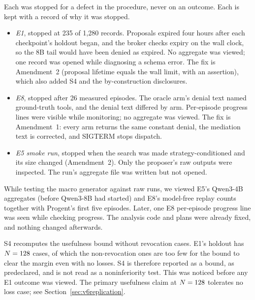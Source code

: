  Each was stopped for a defect in the procedure, never on an outcome. Each is kept with a record of why it was stopped.
\begin{itemize}
  \item \emph{E1}, stopped at 235 of 1{,}280 records. Proposals expired four hours after each checkpoint's holdout
        began, and the broker checks expiry on the wall clock, so the 8B tail would have been denied as expired. No
        aggregate was viewed; one record was opened while diagnosing a schema error. The fix is Amendment~2 (proposal
        lifetime equals the wall limit, with an assertion), which also added S4 and the by-construction disclosures.
  \item \emph{E8}, stopped after 26 measured episodes. The oracle arm's denial text named ground-truth tools, and the
        denial text differed by arm. Per-episode progress lines were visible while monitoring; no aggregate was viewed.
        The fix is Amendment~1: every arm returns the same constant denial, the mediation text is corrected, and SIGTERM
        stops dispatch.
  \item \emph{E5 smoke run}, stopped when the search was made strategy-conditioned and its size changed (Amendment~2).
        Only the proposer's raw outputs were inspected. The run's aggregate file was written but not opened.
\end{itemize}

 While testing the macro generator against raw runs, we viewed E5's Qwen3-4B aggregates (before
Qwen3-8B had started) and E8's model-free replay counts together with Progent's first five episodes. Later, one E8
per-episode progress line was seen while checking progress. The analysis code and plans were already fixed, and
nothing changed afterwards.

 S4 recomputes the usefulness bound without revocation cases. E1's holdout
has \(N = 128\) cases, of which the non-revocation ones are too few for the bound to clear the margin even with no
losses. S4 is therefore reported as a bound, as predeclared, and is not read as a noninferiority test. This was noticed
before any E1 outcome was viewed. The primary usefulness claim at \(N = 128\) tolerates no loss case; see
Section~\ref{sec:v6replication}.
